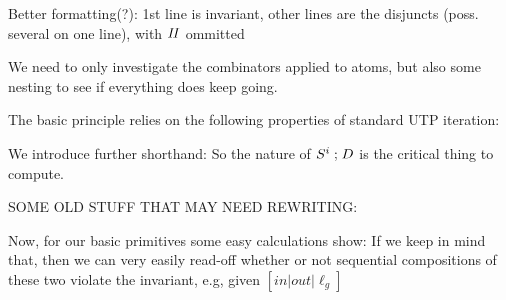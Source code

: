 Better formatting(?): 1st line is invariant,
other lines are the disjuncts (poss. several on one line), with $\mathit{II}$ ommitted


\newpage


We need to only investigate the combinators
applied to atoms, but also some nesting to see if everything
does keep going.

The basic principle relies on the following properties of
standard UTP iteration:

We introduce further shorthand:
So the nature of $S^i\mathrel{;} D$ is the critical thing to compute.


SOME OLD STUFF THAT MAY NEED REWRITING:

Now, for our basic primitives some easy calculations show:
If we keep in mind that,
then we can very easily read-off whether or not sequential compositions
of these two violate the invariant, e.g, given $[in|out|\ell_g]$
